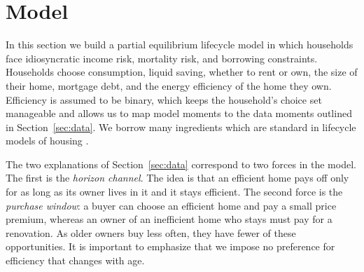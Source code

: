 %
\section{Model}\label{sec:model}

\begingroup

In this section we build a partial equilibrium lifecycle model in which households face idiosyncratic income risk, mortality risk, and borrowing constraints. Households choose consumption, liquid saving, whether to rent or own, the size of their home, mortgage debt, and the energy efficiency of the home they own. Efficiency is assumed to be binary, which keeps the household's choice set manageable and allows us to map model moments to the data moments outlined in Section~\ref{sec:data}.  We borrow many ingredients which are standard in
lifecycle models of housing
\citep{cocco2005portfolio,piazzesi2016housing,kaplan2020housing,yang2009consumption}. 


The two explanations of Section~\ref{sec:data} correspond to two forces in the model.
The first is the \emph{horizon channel}. The idea is that an efficient home pays off only for as long as its owner lives in it and it stays efficient. The second force is the
\emph{purchase window}: a buyer can choose an efficient
home and pay a small price premium, whereas an owner of an inefficient home who stays must pay for a renovation. As older owners buy less often, they have fewer of these
opportunities. It is important to emphasize that we impose no preference for efficiency that changes with age. 


